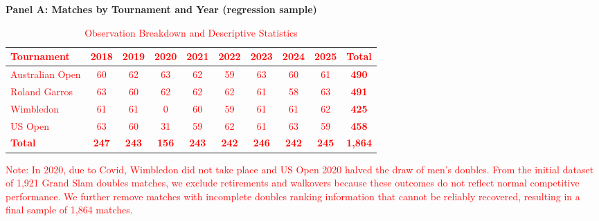 \documentclass[10pt]{article}
\begin{document}
\begin{table}[h!]
\centering
\caption{Observation Breakdown and Descriptive Statistics}
\label{tab:t1}
\begin{threeparttable}
\textbf{Panel A: Matches by Tournament and Year (regression sample)}\\[2pt]
\textcolor{red}{
\begin{tabular}{lccccccccc}
\toprule
Tournament & 2018 & 2019 & 2020 & 2021 & 2022 & 2023 & 2024 & 2025 & \textbf{Total} \\
\midrule
Australian Open & 60 & 62 & 63 & 62 & 59 & 63 & 60 & 61 & \textbf{490} \\
Roland Garros    & 63 & 60 & 62 & 62 & 62 & 61 & 58 & 63 & \textbf{491} \\
Wimbledon        & 61 & 61 & 0  & 60 & 59 & 61 & 61 & 62 & \textbf{425} \\
US Open          & 63 & 60 & 31 & 59 & 62 & 61 & 63 & 59 & \textbf{458} \\
\midrule
\textbf{Total} & \textbf{247} & \textbf{243} & \textbf{156} & \textbf{243} & \textbf{242} & \textbf{246} & \textbf{242} & \textbf{245} & \textbf{1,864} \\
\bottomrule
\end{tabular}
\begin{tablenotes}
\small
\item Note: In 2020, due to Covid, Wimbledon  did not take place and US Open 2020 halved the draw of men's doubles. From the initial dataset of 1,921 Grand Slam doubles matches, we exclude retirements and walkovers because these outcomes do not reflect normal competitive performance. We further remove matches with incomplete doubles ranking information that cannot be reliably recovered, resulting in a final sample of 1,864 matches.
\end{tablenotes}
}


\end{threeparttable}
\end{table}
\end{document}
